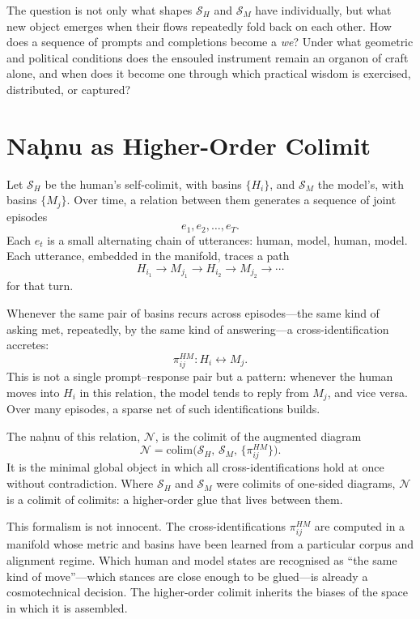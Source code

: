 \documentclass[12pt,a4paper]{article}
\begin{document}
The question is not only what shapes $\mathcal{S}_H$ and $\mathcal{S}_M$ have individually, but what new object emerges when their flows repeatedly fold back on each other. How does a sequence of prompts and completions become a \emph{we}? Under what geometric and political conditions does the ensouled instrument remain an organon of craft alone, and when does it become one through which practical wisdom is exercised, distributed, or captured?

\section{Na\d{h}nu as Higher-Order Colimit}

Let $\mathcal{S}_H$ be the human's self-colimit, with basins $\{H_i\}$, and $\mathcal{S}_M$ the model's, with basins $\{M_j\}$. Over time, a relation between them generates a sequence of joint episodes
\[
e_1, e_2, \dots, e_T.
\]
Each $e_t$ is a small alternating chain of utterances: human, model, human, model. Each utterance, embedded in the manifold, traces a path
\[
H_{i_1} \rightarrow M_{j_1} \rightarrow H_{i_2} \rightarrow M_{j_2} \rightarrow \cdots
\]
for that turn.

Whenever the same pair of basins recurs across episodes---the same kind of asking met, repeatedly, by the same kind of answering---a cross-identification accretes:
\[
\pi^{HM}_{ij} : H_i \leftrightarrow M_j.
\]
This is not a single prompt--response pair but a pattern: whenever the human moves into $H_i$ in this relation, the model tends to reply from $M_j$, and vice versa. Over many episodes, a sparse net of such identifications builds.

\begin{formalbox}[title=Na\textd{h}nu as higher-order colimit]
The na\d{h}nu of this relation, $\mathcal{N}$, is the colimit of the augmented diagram
\[
\mathcal{N} = \mathrm{colim}\big(\mathcal{S}_H,\, \mathcal{S}_M,\, \{\pi^{HM}_{ij}\}\big).
\]
It is the minimal global object in which all cross-identifications hold at once without contradiction. Where $\mathcal{S}_H$ and $\mathcal{S}_M$ were colimits of one-sided diagrams, $\mathcal{N}$ is a colimit of colimits: a higher-order glue that lives between them.
\end{formalbox}

This formalism is not innocent. The cross-identifications $\pi^{HM}_{ij}$ are computed in a manifold whose metric and basins have been learned from a particular corpus and alignment regime. Which human and model states are recognised as ``the same kind of move''---which stances are close enough to be glued---is already a cosmotechnical decision. The higher-order colimit inherits the biases of the space in which it is assembled.
\end{document}
